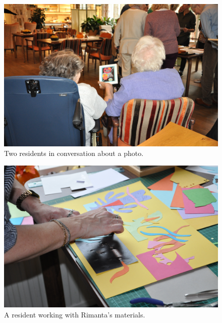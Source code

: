 \documentclass[authordate, empirical]{jote-new-article}
\begin{document}
	\begin{figure}
		\includegraphics[width=\linewidth]{media/fig+6.jpeg}

		\caption{Two residents in conversation about a photo.}



	\end{figure}







	\begin{figure}
		\includegraphics[width=\linewidth]{media/fig+7.jpeg}

		\caption{A resident working with Rimanta's materials.}



	\end{figure}
\end{document}
